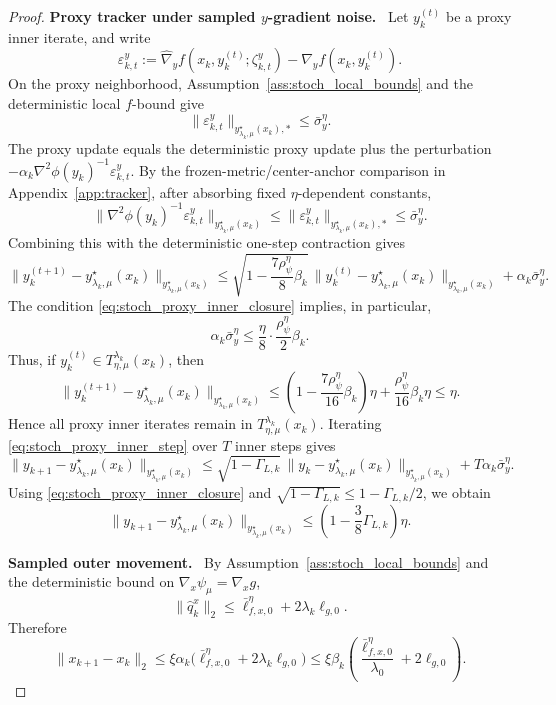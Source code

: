 \documentclass{article}
\newcommand{\proofstep}[1]{\par\smallskip\noindent\textbf{#1}\ }
\begin{document}
\begin{proof}
\proofstep{Proxy tracker under sampled \(y\)-gradient noise.}
Let \(y_k^{(t)}\) be a proxy inner iterate, and write
\[
\varepsilon_{k,t}^{y}
:=
\widehat\nabla_y f(x_k,y_k^{(t)};\zeta_{k,t}^y)
-
\nabla_y f(x_k,y_k^{(t)}).
\]
On the proxy neighborhood, Assumption~\ref{ass:stoch_local_bounds} and the deterministic
local \(f\)-bound give
\[
\|\varepsilon_{k,t}^{y}\|_{y_{\lambda_k,\mu}^\star(x_k),*}
\le
\bar\sigma_y^\eta .
\]
The proxy update equals the deterministic proxy update plus the perturbation
\(-\alpha_k \nabla^2\phi(y_k)^{-1}\varepsilon_{k,t}^y\). By the frozen-metric/center-anchor comparison in
Appendix~\ref{app:tracker}, after absorbing fixed \(\eta\)-dependent constants,
\[
\|\nabla^2\phi(y_k)^{-1}\varepsilon_{k,t}^y\|_{y_{\lambda_k,\mu}^\star(x_k)}
\le
\|\varepsilon_{k,t}^y\|_{y_{\lambda_k,\mu}^\star(x_k),*}
\le
\bar\sigma_y^\eta .
\]
Combining this with the deterministic one-step contraction gives
\begin{equation}
\label{eq:stoch_proxy_inner_step}
\|y_k^{(t+1)}-y_{\lambda_k,\mu}^\star(x_k)\|_{y_{\lambda_k,\mu}^\star(x_k)}
\le
\sqrt{1-\frac{7\rho_\psi^\eta}{8}\beta_k}\,
\|y_k^{(t)}-y_{\lambda_k,\mu}^\star(x_k)\|_{y_{\lambda_k,\mu}^\star(x_k)}
+
\alpha_k\bar\sigma_y^\eta .
\end{equation}
The condition \eqref{eq:stoch_proxy_inner_closure} implies, in particular,
\[
\alpha_k\bar\sigma_y^\eta
\le
\frac{\eta}{8}\cdot \frac{\rho_\psi^\eta}{2}\beta_k .
\]
Thus, if \(y_k^{(t)}\in T_{\eta,\mu}^{\lambda_k}(x_k)\), then
\[
\|y_k^{(t+1)}-y_{\lambda_k,\mu}^\star(x_k)\|_{y_{\lambda_k,\mu}^\star(x_k)}
\le
\left(1-\frac{7\rho_\psi^\eta}{16}\beta_k\right)\eta
+
\frac{\rho_\psi^\eta}{16}\beta_k\eta
\le
\eta .
\]
Hence all proxy inner iterates remain in \(T_{\eta,\mu}^{\lambda_k}(x_k)\). Iterating
\eqref{eq:stoch_proxy_inner_step} over \(T\) inner steps gives
\[
\|y_{k+1}-y_{\lambda_k,\mu}^\star(x_k)\|_{y_{\lambda_k,\mu}^\star(x_k)}
\le
\sqrt{1-\Gamma_{L,k}}\,
\|y_k-y_{\lambda_k,\mu}^\star(x_k)\|_{y_{\lambda_k,\mu}^\star(x_k)}
+
T\alpha_k\bar\sigma_y^\eta .
\]
Using \eqref{eq:stoch_proxy_inner_closure} and
\(\sqrt{1-\Gamma_{L,k}}\le 1-\Gamma_{L,k}/2\), we obtain
\[
\|y_{k+1}-y_{\lambda_k,\mu}^\star(x_k)\|_{y_{\lambda_k,\mu}^\star(x_k)}
\le
\left(1-\frac{3}{8}\Gamma_{L,k}\right)\eta .
\]

\proofstep{Sampled outer movement.}
By Assumption~\ref{ass:stoch_local_bounds} and the deterministic bound on
\(\nabla_x\psi_\mu=\nabla_x g\),
\[
\|\widehat q_k^x\|_2
\le
\bar\ell_{f,x,0}^{\eta}+2\lambda_k\ell_{g,0}.
\]
Therefore
\begin{equation}
\label{eq:stoch_outer_step_bound}
\|x_{k+1}-x_k\|_2
\le
\xi\alpha_k
\bigl(\bar\ell_{f,x,0}^{\eta}+2\lambda_k\ell_{g,0}\bigr)
\le
\xi\beta_k
\left(\frac{\bar\ell_{f,x,0}^{\eta}}{\lambda_0}+2\ell_{g,0}\right).
\end{equation}


\end{proof}
\end{document}
